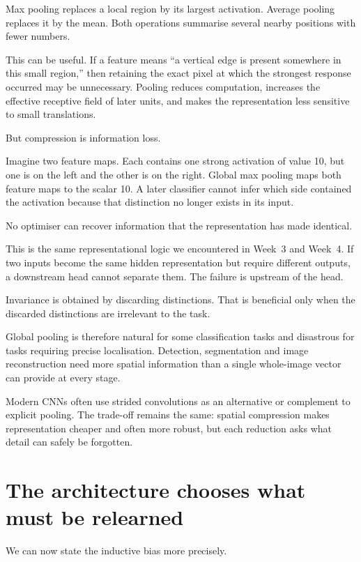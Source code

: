 Max pooling replaces a local region by its largest activation. Average pooling replaces it by the mean. Both operations summarise several nearby positions with fewer numbers.

This can be useful. If a feature means ``a vertical edge is present somewhere in this small region,'' then retaining the exact pixel at which the strongest response occurred may be unnecessary. Pooling reduces computation, increases the effective receptive field of later units, and makes the representation less sensitive to small translations.

But compression is information loss.

Imagine two feature maps. Each contains one strong activation of value 10, but one is on the left and the other is on the right. Global max pooling maps both feature maps to the scalar 10. A later classifier cannot infer which side contained the activation because that distinction no longer exists in its input.

No optimiser can recover information that the representation has made identical.

This is the same representational logic we encountered in Week~3 and Week~4. If two inputs become the same hidden representation but require different outputs, a downstream head cannot separate them. The failure is upstream of the head.

\begin{keyidea}
Invariance is obtained by discarding distinctions. That is beneficial only when the discarded distinctions are irrelevant to the task.
\end{keyidea}

Global pooling is therefore natural for some classification tasks and disastrous for tasks requiring precise localisation. Detection, segmentation and image reconstruction need more spatial information than a single whole-image vector can provide at every stage.

Modern CNNs often use strided convolutions as an alternative or complement to explicit pooling. The trade-off remains the same: spatial compression makes representation cheaper and often more robust, but each reduction asks what detail can safely be forgotten.

\section{The architecture chooses what must be relearned}

We can now state the inductive bias more precisely.

